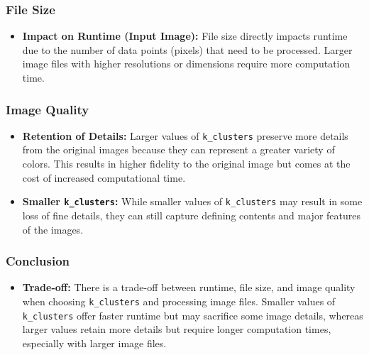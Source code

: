 \subsubsection{File Size}
\begin{itemize}
    \item \textbf{Impact on Runtime (Input Image):} File size directly impacts runtime due to the number of data points (pixels) that need to be processed. Larger image files with higher resolutions or dimensions require more computation time.
\end{itemize}

\subsubsection{Image Quality}
\begin{itemize}
    \item \textbf{Retention of Details:} Larger values of \texttt{k\_clusters} preserve more details from the original images because they can represent a greater variety of colors. This results in higher fidelity to the original image but comes at the cost of increased computational time.
    \item \textbf{Smaller \texttt{k\_clusters}:} While smaller values of \texttt{k\_clusters} may result in some loss of fine details, they can still capture defining contents and major features of the images.
\end{itemize}

\subsubsection{Conclusion}
\begin{itemize}
    \item \textbf{Trade-off:} There is a trade-off between runtime, file size, and image quality when choosing \texttt{k\_clusters} and processing image files. Smaller values of \texttt{k\_clusters} offer faster runtime but may sacrifice some image details, whereas larger values retain more details but require longer computation times, especially with larger image files.
\end{itemize}

\pagebreak